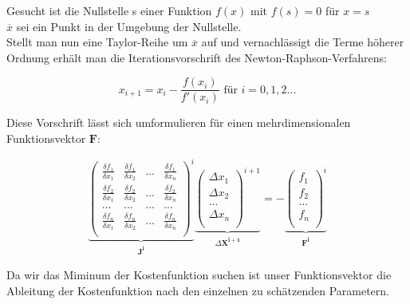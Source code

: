 \noindent \tab Gesucht ist die Nullstelle s einer Funktion $f(x)$ mit $f(s)=0$ für $x=s$ \\
\tab $\overline{x}$ sei ein Punkt in der Umgebung der Nullstelle.\\

Stellt man nun eine Taylor-Reihe um $\overline{x}$ auf und vernachlässigt die Terme höherer Ordnung erhält man die Iterationsvorschrift des Newton-Raphson-Verfahrens:

 \begin{equation}
	x_{i+1} = x_{i} - \frac{f(x_{i})}{f'(x_{i})} \text{ für }i=0,1,2...
	\label{eq:Newton_Raphson}
\end{equation}  

Diese Vorschrift lässt sich umformulieren für einen mehrdimensionalen Funktionsvektor $\mathbf{F}$:

 \begin{equation}
	\underbrace{\begin{pmatrix}
	\frac{\delta f_{1}}{\delta x_{1}} & \frac{\delta f_{1}}{\delta x_{2}} & ... & \frac{\delta f_{1}}    		{\delta x_{n}}\\
	\frac{\delta f_{2}}{\delta x_{1}} & \frac{\delta f_{2}}{\delta x_{2}} & ... & \frac{\delta f_{2}}			{\delta x_{n}}\\
	... & ... & ... & ...\\
	\frac{\delta f_{n}}{\delta x_{1}} & \frac{\delta f_{n}}{\delta x_{2}} & ... & \frac{\delta f_{n}}			{\delta x_{n}}\\
	\end{pmatrix}^{i}}_{\substack{\mathbf{J^{i}}}}
	\underbrace{\begin{pmatrix}
	\Delta x_{1}\\
	\Delta x_{2}\\
	...\\
	\Delta x_{n}\\
	\end{pmatrix}^{i+1}}_{\substack{\Delta \mathbf{X^{i+1}}}} = -
	\underbrace{\begin{pmatrix}
	f_{1}\\
	f_{2}\\
	...\\
	f_{n}\\
	\end{pmatrix}^{i}}_{\substack{\mathbf{F^{i}}}}
	\label{eq:Newton_Raphson_MIMO}
\end{equation} 

Da wir das Miminum der Kostenfunktion suchen ist unser Funktionsvektor die Ableitung der Kostenfunktion nach den einzelnen zu schätzenden Parametern. 


